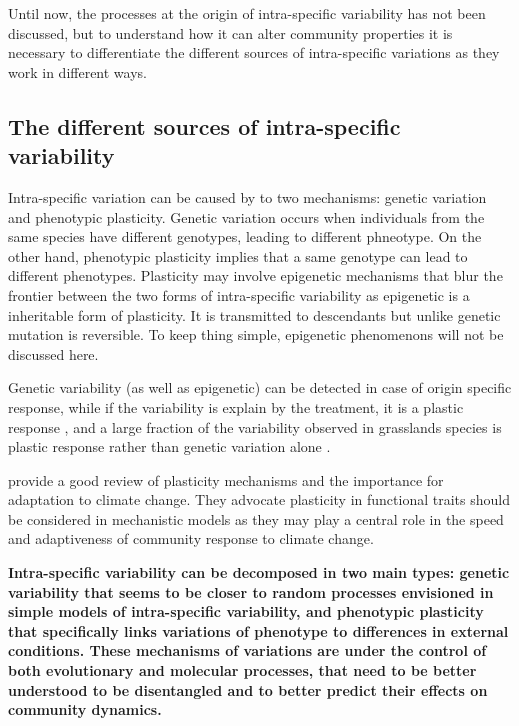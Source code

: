 Until now, the processes at the origin of intra-specific variability has not been discussed, but to understand how it can alter community properties it is necessary to differentiate the different sources of intra-specific variations as they work in different ways.

\subsection{The different sources of intra-specific variability}

Intra-specific variation can be caused by to two mechanisms: genetic variation and phenotypic plasticity. Genetic variation occurs when individuals from the same species have different genotypes, leading to different phneotype. On the other hand, phenotypic plasticity implies that a same genotype can lead to different phenotypes. Plasticity may involve epigenetic mechanisms \parencite{nicotra_adaptive_2015} that blur the frontier between the two forms of intra-specific variability as epigenetic is a inheritable form of plasticity. It is transmitted to descendants but unlike genetic mutation is reversible. To keep thing simple, epigenetic phenomenons will not be discussed here.

Genetic variability (as well as epigenetic) can be detected in case of origin specific response, while if the variability is explain by the treatment, it is a plastic response \cite{frei_plastic_2014}, and a large fraction of the variability observed in grasslands species is plastic response rather than genetic variation alone \cite{frei_plastic_2014, merila_climate_2014}.

\cite{nicotra_plant_2010} provide a good review of plasticity mechanisms and the importance for adaptation to climate change. They advocate plasticity in functional traits should be considered in mechanistic models as they may play a central role in the speed and adaptiveness of community response to climate change.


\textbf{Intra-specific variability can be decomposed in two main types: genetic variability that seems to be closer to random processes envisioned in simple models of intra-specific variability, and phenotypic plasticity that specifically links variations of phenotype to differences in external conditions. These mechanisms of variations are under the control of both evolutionary and molecular processes, that need to be better understood to be disentangled and to better predict their effects on community dynamics.}

